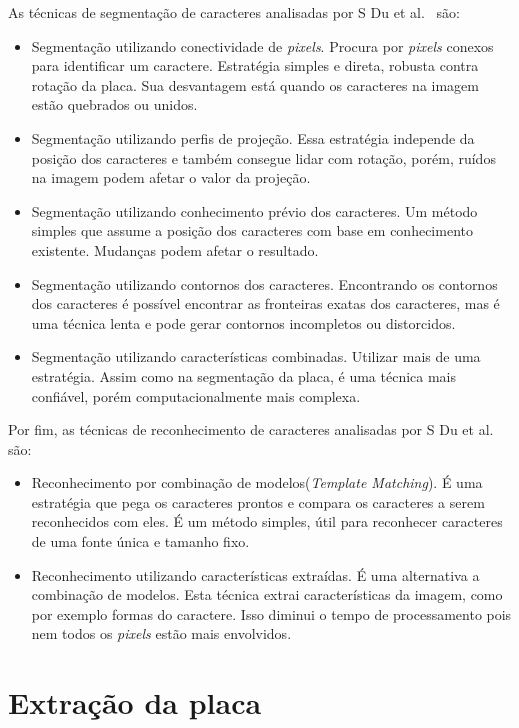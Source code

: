 As técnicas de segmentação de caracteres analisadas por S Du et al.~\cite{s2013automatic} são:

\begin{itemize}
	\item Segmentação utilizando conectividade de \emph{pixels}. Procura por \emph{pixels} conexos para identificar um caractere. Estratégia simples e direta, robusta contra rotação da placa. Sua desvantagem está quando os caracteres na imagem estão quebrados ou unidos.
    \item Segmentação utilizando perfis de projeção. Essa estratégia independe da posição dos caracteres e também consegue lidar com rotação, porém, ruídos na imagem podem afetar o valor da projeção.
    \item Segmentação utilizando conhecimento prévio dos caracteres. Um método simples que assume a posição dos caracteres com base em conhecimento existente. Mudanças podem afetar o resultado.
    \item Segmentação utilizando contornos dos caracteres. Encontrando os contornos dos caracteres é possível encontrar as fronteiras exatas dos caracteres, mas é uma técnica lenta e pode gerar contornos incompletos ou distorcidos.
    \item Segmentação utilizando características combinadas. Utilizar mais de uma estratégia. Assim como na segmentação da placa, é uma técnica mais confiável, porém computacionalmente mais complexa.    
\end{itemize}

Por fim, as técnicas de reconhecimento de caracteres analisadas por S Du et al.~\cite{s2013automatic} são:

\begin{itemize}
	\item Reconhecimento por combinação de modelos(\emph{Template Matching}). É uma estratégia que pega os caracteres prontos e compara os caracteres a serem reconhecidos com eles. É um método simples, útil para reconhecer caracteres de uma fonte única e tamanho fixo.
    \item Reconhecimento utilizando características extraídas. É uma alternativa a combinação de modelos. Esta técnica extrai características da imagem, como por exemplo formas do caractere. Isso diminui o tempo de processamento pois nem todos os \emph{pixels} estão mais envolvidos. 
\end{itemize}

\section{Extração da placa}

